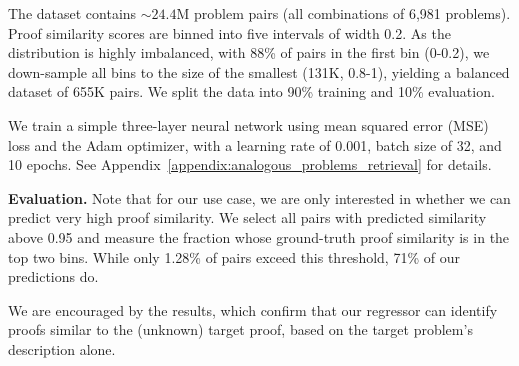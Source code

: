 The dataset contains $\sim24.4$M  problem pairs (all combinations of 6,981 problems). Proof similarity scores are binned into five intervals of width 0.2. %
As the distribution is highly imbalanced, with 88\% of pairs in the first bin (0-0.2), we down-sample all bins to the size of the smallest (131K, 0.8-1), yielding a balanced dataset of 655K pairs. We split the data into 90\% training and 10\% evaluation.

We train a simple three-layer neural network %
using mean squared error (MSE) loss and the Adam optimizer, with a learning rate of 0.001, batch size of 32, and 10 epochs. See Appendix~\ref{appendix:analogous_problems_retrieval} for details.




\noindent\textbf{Evaluation.}
Note that for our use case, we are only interested in whether we can predict very high proof similarity. %
We select all pairs with predicted similarity above 0.95 and measure the fraction whose ground-truth proof similarity is in the top two bins. While only 1.28\% of  pairs exceed this threshold, %
71\% of our predictions do.

We are encouraged by the results, which confirm that our regressor can identify proofs similar to the (unknown) target proof, based on the target problem's description alone.








